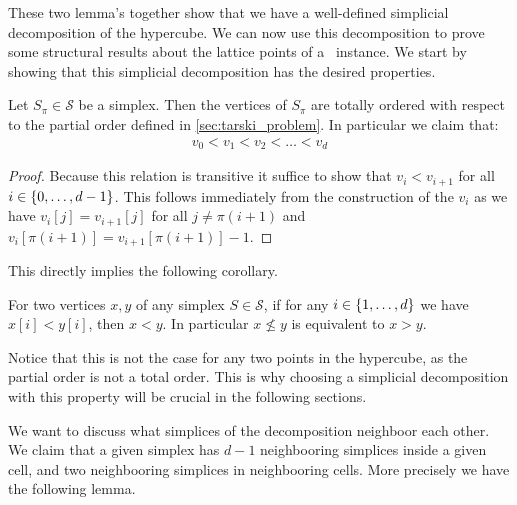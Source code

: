 These two lemma's together show that we have a well-defined simplicial decomposition of the hypercube. We can now use this decomposition to prove some structural results about the lattice points of a \Tarski\ instance. We start by showing that this simplicial decomposition has the desired properties.
\begin{lemma}
    Let $S_{\pi} \in \mathcal{S}$ be a simplex. Then the vertices of $S_{\pi}$ are totally ordered with respect to the partial order defined in \cref{sec:tarski_problem}. In particular we claim that:
    \begin{align*}
        v_0 < v_1 < v_2 < \dots < v_d
    \end{align*}
\end{lemma}
\begin{proof}
    Because this relation is transitive it suffice to show that $v_i < v_{i+1}$ for all $i \in \left\{0, \dots, d-1\right\}$. This follows immediately from the construction of the $v_i$ as we have $v_i[j] = v_{i+1}[j]$ for all $j \neq \pi(i+1)$ and $v_i[\pi(i+1)] = v_{i+1}[\pi(i+1)] - 1$.
\end{proof}
This directly implies the following corollary.
\begin{corollary}
    \label{cor:total_ordering}
    For two vertices $x,y$ of any simplex $S \in \mathcal{S}$, if for any $i \in \left\{1, \dots, d\right\}$ we have $x[i] < y[i]$, then $x < y$. In particular $x \not\leq y$ is equivalent to $x > y$.
\end{corollary}
Notice that this is not the case for any two points in the hypercube, as the partial order is not a total order. This is why choosing a simplicial decomposition with this property will be crucial in the following sections.

We want to discuss what simplices of the decomposition neighboor each other. We claim that a given simplex has $d-1$ neighbooring simplices inside a given cell, and two neighbooring simplices in neighbooring cells. More precisely we have the following lemma.

